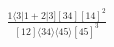 \documentclass[varwidth, border=5pt]{standalone}
\begin{document}
\begin{my}
$\begin{gathered}
\scriptscriptstyle\frac{1⟨3|1+2|3][34][14]^2}{[12]⟨34⟩⟨45⟩[45]^3}
\end{gathered}$
\end{my}
\end{document}
